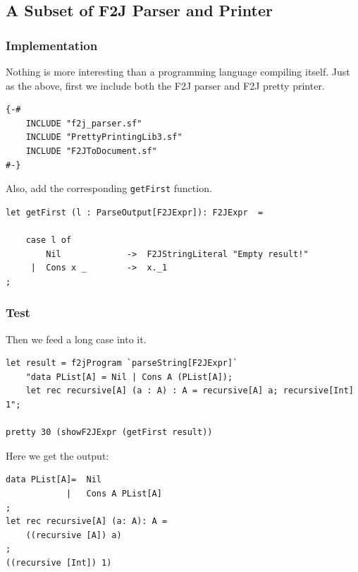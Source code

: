\subsection{A Subset of F2J Parser and Printer}

\subsubsection{Implementation}
Nothing is more interesting than a programming language compiling itself. Just as the above, first we include both the F2J parser and F2J pretty printer.
\begin{lstlisting}
{-#
    INCLUDE "f2j_parser.sf"
    INCLUDE "PrettyPrintingLib3.sf"
    INCLUDE "F2JToDocument.sf"
#-}
\end{lstlisting}

Also, add the corresponding \texttt{getFirst} function.
\begin{lstlisting}
let getFirst (l : ParseOutput[F2JExpr]): F2JExpr  =

    case l of
        Nil             ->  F2JStringLiteral "Empty result!"
     |  Cons x _        ->  x._1
;
\end{lstlisting}

\subsubsection{Test}
Then we feed a long case into it.
\begin{lstlisting}
let result = f2jProgram `parseString[F2JExpr]` 
    "data PList[A] = Nil | Cons A (PList[A]); 
    let rec recursive[A] (a : A) : A = recursive[A] a; recursive[Int] 1";
    
pretty 30 (showF2JExpr (getFirst result))
\end{lstlisting}

Here we get the output:
\begin{lstlisting}
data PList[A]= 	Nil
            |	Cons A PList[A]
;
let rec recursive[A] (a: A): A =
    ((recursive [A]) a)
;
((recursive [Int]) 1)
\end{lstlisting}



